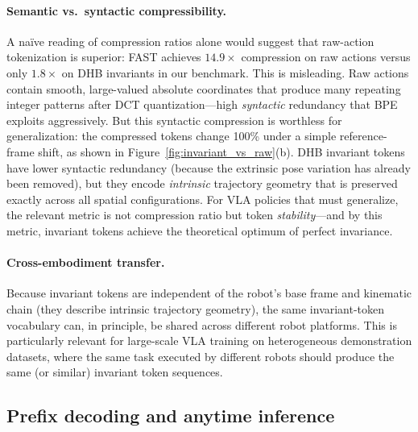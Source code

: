 \documentclass[11pt]{article}
\begin{document}
\paragraph{Semantic vs.\ syntactic compressibility.}
A na\"{i}ve reading of compression ratios alone would suggest that raw-action tokenization is superior: FAST achieves $14.9\times$ compression on raw actions versus only $1.8\times$ on DHB invariants in our benchmark. This is misleading. Raw actions contain smooth, large-valued absolute coordinates that produce many repeating integer patterns after DCT quantization---high \emph{syntactic} redundancy that BPE exploits aggressively. But this syntactic compression is worthless for generalization: the compressed tokens change 100\% under a simple reference-frame shift, as shown in Figure~\ref{fig:invariant_vs_raw}(b). DHB invariant tokens have lower syntactic redundancy (because the extrinsic pose variation has already been removed), but they encode \emph{intrinsic} trajectory geometry that is preserved exactly across all spatial configurations. For VLA policies that must generalize, the relevant metric is not compression ratio but token \emph{stability}---and by this metric, invariant tokens achieve the theoretical optimum of perfect invariance.

\paragraph{Cross-embodiment transfer.}
Because invariant tokens are independent of the robot's base frame and kinematic chain (they describe intrinsic trajectory geometry), the same invariant-token vocabulary can, in principle, be shared across different robot platforms. This is particularly relevant for large-scale VLA training on heterogeneous demonstration datasets, where the same task executed by different robots should produce the same (or similar) invariant token sequences.

\subsection{Prefix decoding and anytime inference}
\end{document}
